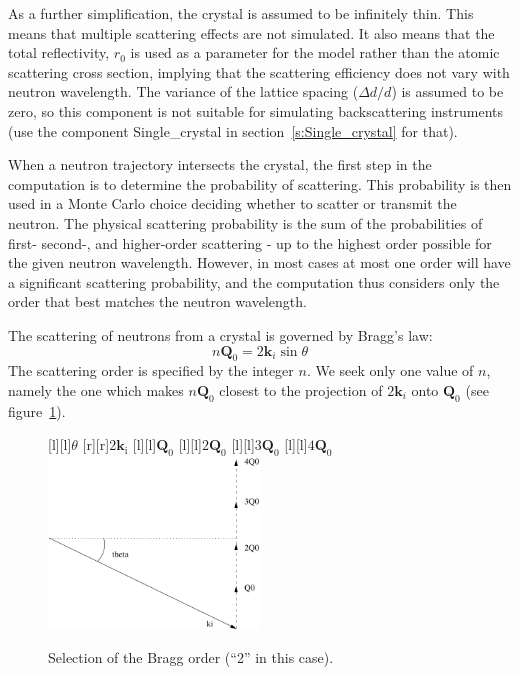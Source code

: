 As a further simplification, the crystal is assumed to be infinitely
thin. This means that multiple scattering effects are not simulated. It
also means that the total reflectivity, $r_0$ is used as a parameter for
the model rather than the atomic scattering cross section, implying that
the scattering efficiency does not vary with neutron wavelength.
The variance
of the lattice spacing ($\Delta d/d$) is assumed to be zero, so this
component is not suitable for simulating backscattering instruments (use
the component \textrm{Single\_crystal}
in section~\ref{s:Single_crystal} for that).

When a neutron trajectory intersects the crystal, the first step in the
computation is to determine the probability of scattering. This
probability is then used in a Monte Carlo choice deciding whether to
scatter or transmit the neutron. The physical scattering probability is the sum
of the probabilities of first- second-, and higher-order scattering -
up to the highest order possible for the given neutron wavelength.
However, in most cases at most one order will have a
significant scattering probability, and the computation thus considers
only the order that best matches the neutron wavelength.

The scattering of neutrons from a crystal is governed by Bragg's law:
\begin{equation}
n\textbf{Q}_0 = 2\textbf{k}_i\sin\theta
\end{equation}
The scattering order is specified by the integer $n$. We seek only one
value of $n$, namely the one which makes
$n \textbf{Q}_0$ closest to the projection of $2\textbf{k}_i$ onto $\textbf{Q}_0$
(see figure~\ref{f:mosaic_order}).
%
%
\begin{figure}
  \begin{center}
    [l][l]{$\theta$}
    [r][r]{$2\textbf{k}_\textrm{i}$}
    [l][l]{$\textbf{Q}_0$}
    [l][l]{$2\textbf{Q}_0$}
    [l][l]{$3\textbf{Q}_0$}
    [l][l]{$4\textbf{Q}_0$}
    \includegraphics[width=0.5\textwidth]{figures/mosaic_order}
  \end{center}
\caption{Selection of the Bragg order (``2'' in this case).}
\label{f:mosaic_order}
\end{figure}
%

